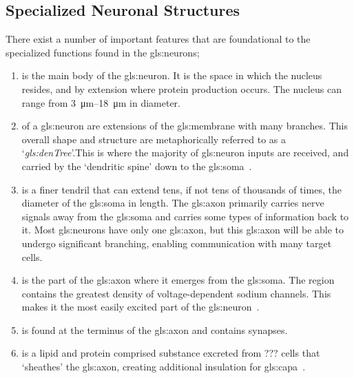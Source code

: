 \documentclass[class={myRUCProject}, crop=false]{standalone}
\begin{document}
\subsection{Specialized Neuronal Structures}
There exist a number of important features that are foundational to the specialized functions found in the \glspl{gls:neuron};
\begin{enumerate}
  \item {} is the main body of the \gls{gls:neuron}. It is the space in which the nucleus resides, and by extension where protein production occurs. The nucleus can range from \qtyrange{3}{18}{\um} in diameter.
  \item {} of a \gls{gls:neuron} are extensions of the \gls{gls:membrane} with many branches. This overall shape and structure are metaphorically referred to as a `\textit{\gls{gls:denTree}}'.\footnotemark This is where the majority of \gls{gls:neuron} inputs are received, and carried by the `dendritic spine' down to the \gls{gls:soma}~\cite{}. 
  \item {} is a finer tendril that can extend tens, if not tens of thousands of times, the diameter of the \gls{gls:soma} in length. The \gls{gls:axon} primarily carries nerve signals away from the \gls{gls:soma} and carries some types of information back to it. Most \glspl{gls:neuron} have only one \gls{gls:axon}, but this \gls{gls:axon} will be able to undergo significant branching, enabling communication with many target cells. 
  \item {} is the part of the \gls{gls:axon} where it emerges from the \gls{gls:soma}. The region contains the greatest density of voltage-dependent sodium channels. This makes it the most easily excited part of the \gls{gls:neuron}~\cite{}. 
  \item {} is found at the terminus of the \gls{gls:axon} and contains synapses. 
  \item {} is a lipid and protein comprised substance excreted from ??? cells that `sheathes' the \gls{gls:axon}, creating additional insulation for \gls{gls:capa}~\cite{}.
\end{enumerate}
\end{document}
